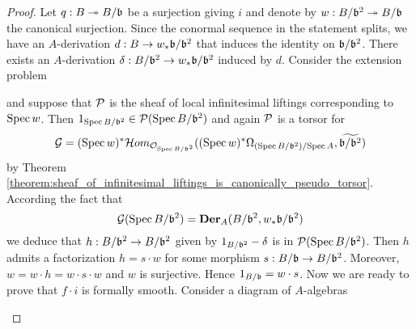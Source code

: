 \begin{proof}
Let $q:B\twoheadrightarrow B/\mathfrak{b}$ be a surjection giving $i$ and denote by $w:B/\mathfrak{b}^2\twoheadrightarrow B/\mathfrak{b}$ the canonical surjection. Since the conormal sequence in the statement splits, we have an $A$-derivation $d:B\rightarrow w_*\mathfrak{b}/\mathfrak{b}^2$ that induces the identity on $\mathfrak{b}/\mathfrak{b}^2$. There exists an $A$-derivation $\delta:B/\mathfrak{b}^2\rightarrow w_*\mathfrak{b}/\mathfrak{b}^2$ induced by $d$. Consider the extension problem
\begin{center}
\end{center}
and suppose that ${\mathcal P}$ is the sheaf of local infinitesimal liftings corresponding to $\mathrm{Spec}\, w$. Then $1_{\mathrm{Spec}\, B/\mathfrak{b}^2} \in {\mathcal P}(\mathrm{Spec}\, B/\mathfrak{b}^2)$ and again ${\mathcal P}$ is a torsor for
$${\mathcal G} = (\mathrm{Spec}\, w)^*{\mathcal H}om_{{\mathcal O}_{\mathrm{Spec}\, B/\mathfrak{b}^2}}((\mathrm{Spec}\, w)^*\Omega_{(\mathrm{Spec}\,  B/\mathfrak{b}^2)/\mathrm{Spec}\, A}, \widetilde{\mathfrak{b}/\mathfrak{b}^2})$$
by Theorem \ref{theorem:sheaf_of_infinitesimal_liftings_is_canonically_pseudo_torsor}. According the fact that
$${\mathcal G}(\mathrm{Spec}\, B/\mathfrak{b}^2)=\mathbf{Der}_A(B/\mathfrak{b}^2,w_*\mathfrak{b}/\mathfrak{b}^2)$$
we deduce that $h:B/\mathfrak{b}^2\rightarrow B/\mathfrak{b}^2$ given by $1_{B/\mathfrak{b}^2}-\delta$ is in ${\mathcal P}(\mathrm{Spec}\, B/\mathfrak{b}^2)$. Then  $h$ admits a factorization $h = s\cdot w$ for some morphism $s:B/\mathfrak{b}\rightarrow B/\mathfrak{b}^2$. Moreover, $w = w\cdot h = w\cdot s\cdot w$ and $w$ is surjective. Hence $1_{B/\mathfrak{b}} = w \cdot s$. Now we are ready to prove that $f\cdot i$ is formally smooth. Consider a diagram of $A$-algebras
\begin{center}
\end{center}
\end{proof}
